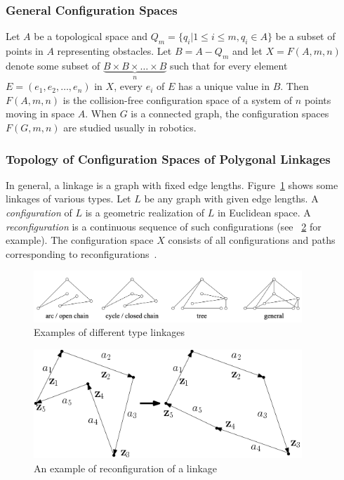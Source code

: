 \subsubsection{General Configuration Spaces}
Let \(A\) be a topological space and \(Q_m=\{q_i|1\le i\le m, q_i\in A\}\) be a subset of points in \(A\) representing obstacles.
Let \(B=A-Q_m\) and let \(X=F(A,m,n)\) denote some subset of \(\underbrace{B\times B\times\dots\times B}_{n}\) such that
for every element \(E=(e_1,e_2,\dots,e_n)\) in \(X\), every \(e_i\) of \(E\) has a unique value in \(B\).
Then \(F(A,m,n)\) is the collision-free configuration space of a system of \(n\) points moving in space \(A\).
When \(G\) is a connected graph, the configuration spaces \(F(G,m,n)\) are studied usually in robotics.

\subsubsection{Topology of Configuration Spaces of Polygonal Linkages}
In general, a linkage is a graph with fixed edge lengths. Figure~\ref{fig:linkage1} shows some linkages of various types. Let \(L\) be any graph with given edge lengths. A \textit{configuration} of \(L\) is a geometric realization of \(L\) in Euclidean space.
A \textit{reconfiguration} is a continuous sequence of such configurations (see ~\ref{fig:reconfig} for example).
The configuration space \(X\) consists of all configurations and paths corresponding to reconfigurations~\cite{connelly2004geometry}.
\begin{figure}
  \centering
  \includegraphics[width=0.9\textwidth]{fig-linkage1}
  \caption{Examples of different type linkages~\cite{connelly2004geometry}}
  \label{fig:linkage1}
\end{figure}

\begin{figure}
  \centering
  \includegraphics[width=0.9\textwidth]{fig-reconfig}
  \caption{An example of reconfiguration of a linkage}
  \label{fig:reconfig}
\end{figure}

